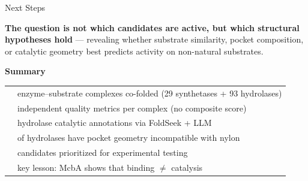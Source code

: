 \documentclass[aspectratio=169, 11pt]{beamer}
\begin{document}
\begin{frame}{Next Steps}
\vspace{6pt}
\colorbox{accentgreen!15}{\parbox{0.88\textwidth}{\centering
\textbf{The question is not which candidates are active, but which structural hypotheses hold} --- revealing whether substrate similarity, pocket composition, or catalytic geometry best predicts activity on non-natural substrates.
}}
\end{frame}

{
\begin{frame}[plain]
\vfill
\begin{center}
{\Large\bfseries\color{white} Summary}\\[16pt]
{\normalsize\color{lightblue}
\begin{tabular}{rl}
\color{accentorange}{122} & \color{white} enzyme--substrate complexes co-folded (29 synthetases + 93 hydrolases) \\[6pt]
\color{accentorange}{8} & \color{white} independent quality metrics per complex (no composite score) \\[6pt]
\color{accentorange}{3$\rightarrow$22} & \color{white} hydrolase catalytic annotations via FoldSeek + LLM \\[6pt]
\color{accentorange}{44\%} & \color{white} of hydrolases have pocket geometry incompatible with nylon \\[6pt]
\color{accentorange}{5} & \color{white} candidates prioritized for experimental testing \\[6pt]
\color{accentorange}{1} & \color{white} key lesson: McbA shows that binding $\neq$ catalysis \\[6pt]
\end{tabular}
}
\end{center}
\vfill
\end{frame}
}
\end{document}
